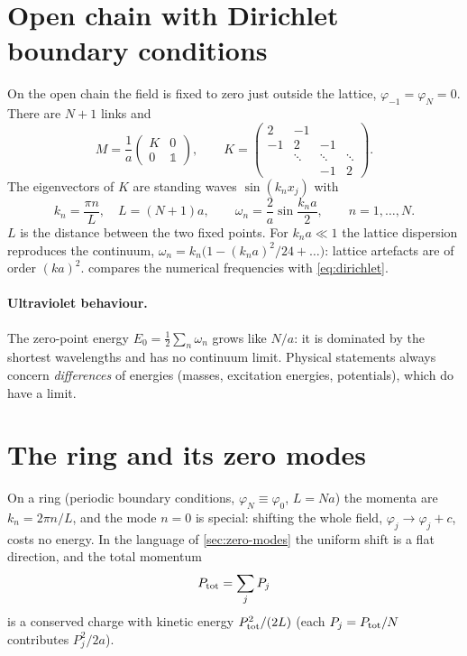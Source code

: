 \section{Open chain with Dirichlet boundary conditions}
On the open chain the field is fixed to zero just outside the lattice, $\varphi_{-1} = \varphi_N = 0$. There
are $N+1$ links and
\begin{equation}
  M = \frac1a\begin{pmatrix} K & 0 \\ 0 & \mathbb{1}\end{pmatrix},\qquad
  K = \begin{pmatrix} 2 & -1 & & \\ -1 & 2 & -1 & \\ & \ddots & \ddots & \ddots \\ & & -1 & 2\end{pmatrix}.
\end{equation}
The eigenvectors of $K$ are standing waves $\sin(k_n x_j)$ with
\begin{equation}\label{eq:dirichlet}
  k_n = \frac{\pi n}{L},\quad L = (N+1)a, \qquad
  \omega_n = \frac{2}{a}\sin\frac{k_n a}{2},\qquad n = 1,\dots,N .
\end{equation}
$L$ is the distance between the two fixed points. For $k_n a \ll 1$ the lattice dispersion reproduces the
continuum, $\omega_n = k_n\bigl(1 - (k_na)^2/24 + \dots\bigr)$: lattice artefacts are of order $(ka)^2$.
 compares the numerical frequencies with \eqref{eq:dirichlet}.


\paragraph{Ultraviolet behaviour.} The zero-point energy $E_0 = \frac12\sum_n\omega_n$ grows like $N/a$: it
is dominated by the shortest wavelengths and has no continuum limit. Physical statements always concern
\emph{differences} of energies (masses, excitation energies, potentials), which do have a limit.

\section{The ring and its zero modes}\label{sec:ring}
On a ring (periodic boundary conditions, $\varphi_N \equiv \varphi_0$, $L = Na$) the momenta are
$k_n = 2\pi n/L$, and the mode $n = 0$ is special: shifting the whole field, $\varphi_j \to \varphi_j + c$,
costs no energy. In the language of \cref{sec:zero-modes} the uniform shift is a flat direction, and the total
momentum
\begin{equation}
  P_{\rm tot} = \sum_j P_j
\end{equation}
is a conserved charge with kinetic energy $P_{\rm tot}^2/(2L)$ (each $P_j = P_{\rm tot}/N$ contributes
$P_j^2/2a$).

